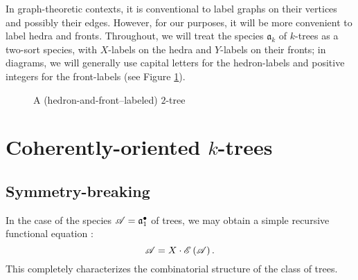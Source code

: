 \documentclass[sectionflow,singlespace,twoside,boldmathhdr]{brandiss} %
\numberwithin{section}{chapter}
\numberwithin{figure}{chapter}
\begin{document}
In graph-theoretic contexts, it is conventional to label graphs on their vertices and possibly their edges.
However, for our purposes, it will be more convenient to label hedra and fronts.
Throughout, we will treat the species $\mathfrak{a}_{k}$ of $k$-trees as a two-sort species, with $X$-labels on the hedra and $Y$-labels on their fronts; in diagrams, we will generally use capital letters for the hedron-labels and positive integers for the front-labels (see Figure \ref{fig:exlab2tree}).

\begin{figure}[htb]
  \centering
  \caption{A (hedron-and-front--labeled) $2$-tree}
  \label{fig:exlab2tree}
\end{figure}

\section{Coherently-oriented $k$-trees}
\subsection{Symmetry-breaking}\label{ss:symbreak}
In the case of the species $\mathscr{A} = {\mathfrak{a}}^{\bullet }_{1}$ of trees, we may obtain a simple recursive functional equation \cite[\S 1, eq.\ (9)]{bll:species}:
\begin{equation}
  \label{eq:rtrees}
  \mathscr{A} = X \cdot \mathscr{E} \left( {\mathscr{A}} \right).
\end{equation}
This completely characterizes the combinatorial structure of the class of trees.
\end{document}
